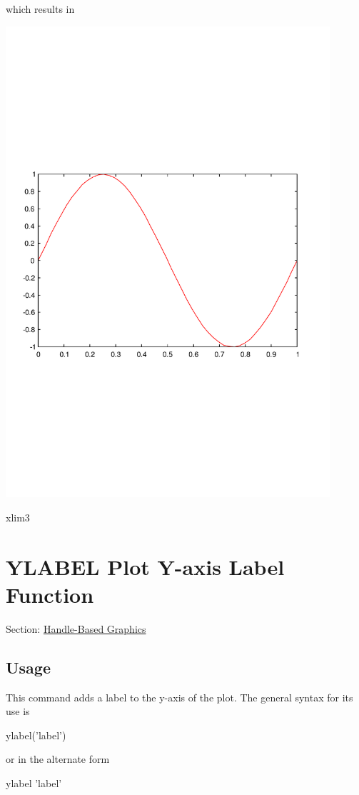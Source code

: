 which results in  
\begin{DoxyImage}
\includegraphics[width=12cm]{xlim3}
\caption{xlim3}
\end{DoxyImage}
 \hypertarget{handle_ylabel}{}\section{Y\-L\-A\-B\-E\-L Plot Y-\/axis Label Function}\label{handle_ylabel}
Section\-: \hyperlink{sec_handle}{Handle-\/\-Based Graphics} \hypertarget{vtkwidgets_vtkxyplotwidget_Usage}{}\subsection{Usage}\label{vtkwidgets_vtkxyplotwidget_Usage}
This command adds a label to the y-\/axis of the plot. The general syntax for its use is \begin{DoxyVerb}  ylabel('label')
\end{DoxyVerb}
 or in the alternate form \begin{DoxyVerb}  ylabel 'label'
\end{DoxyVerb}
